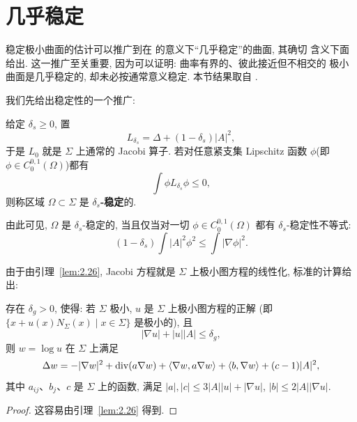 \section{几乎稳定}
\label{sec:2.7}

稳定极小曲面的估计可以推广到在 \cite{CM4} 的意义下``几乎稳定''的曲面, 其确切
含义下面给出. 这一推广至关重要, 因为可以证明: 曲率有界的、彼此接近但不相交的
极小曲面是几乎稳定的, 却未必按通常意义稳定. 本节结果取自 \cite{CM4}.

我们先给出稳定性的一个推广:

\begin{definition}[$\delta_s$-稳定]
\label{def:2.27}
给定 $\delta_s\geq0$, 置
\begin{equation}
L_{\delta_s}=\Delta+(1-\delta_s)|A|^{2},
\label{eq:2.135}
\end{equation}
于是 $L_0$ 就是 $\Sigma$ 上通常的 Jacobi 算子. 若对任意紧支集 Lipschitz 函数
$\phi$(即 $\phi\in C_0^{0,1}(\Omega)$)都有
\[
\int\phi L_{\delta_s}\phi\leq0,
\]
则称区域 $\Omega\subset\Sigma$ 是 \textbf{$\delta_s$-稳定}的.
\end{definition}

由此可见, $\Omega$ 是 $\delta_s$-稳定的, 当且仅当对一切
$\phi\in C_0^{0,1}(\Omega)$ 都有 $\delta_s$-稳定性不等式:
\begin{equation}
(1-\delta_s)\int|A|^{2}\phi^{2}\leq\int|\nabla\phi|^{2}.
\label{eq:2.136}
\end{equation}

由于由引理~\ref{lem:2.26}, Jacobi 方程就是 $\Sigma$ 上极小图方程的线性化,
标准的计算给出:

\begin{lemma}
\label{lem:2.28}
存在 $\delta_g>0$, 使得: 若 $\Sigma$ 极小, $u$ 是 $\Sigma$ 上极小图方程的正解
(即 $\{x+u(x)N_{\Sigma}(x)\mid x\in\Sigma\}$ 是极小的), 且
\[
|\nabla u|+|u||A|\leq\delta_g,
\]
则 $w=\log u$ 在 $\Sigma$ 上满足
\begin{equation}
\Delta w=-|\nabla w|^{2}+\operatorname{div}(a\nabla w)+\langle\nabla w,a\nabla w\rangle
 +\langle b,\nabla w\rangle+(c-1)|A|^{2},
\label{eq:2.137}
\end{equation}
其中 $a_{ij}$、$b_j$、$c$ 是 $\Sigma$ 上的函数, 满足
$|a|,|c|\leq3|A||u|+|\nabla u|$, $|b|\leq2|A||\nabla u|$.
\end{lemma}

\begin{proof}
这容易由引理~\ref{lem:2.26} 得到.
\end{proof}

